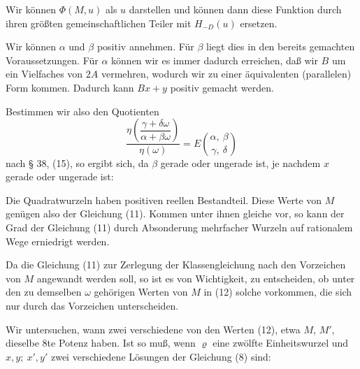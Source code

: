 
Wir können $\Phi(M,u)$ als  $u$ darstellen und können dann diese Funktion durch ihren größten gemeinschaftlichen Teiler mit $H_{-D}(u)$ ersetzen.

Wir können $\alpha$ und $\beta$ positiv annehmen. Für $\beta$ liegt dies in den bereits gemachten Voraussetzungen. Für $\alpha$ können wir es immer dadurch erreichen, daß wir $B$ um ein Vielfaches von $2A$ vermehren, wodurch wir zu einer äquivalenten (parallelen) Form kommen. Dadurch kann $Bx+y$ positiv gemacht werden.

Bestimmen wir also den Quotienten
\[
\frac{\eta\left(\dfrac{\gamma+\delta\omega}{\alpha+\beta\omega}\right)}{\eta(\omega)} = E\binom{\alpha,\ \beta}{\gamma,\ \delta}
\]
nach § 38, (15), so ergibt sich, da $\beta$ gerade oder ungerade ist, je nachdem $x$ gerade oder ungerade ist:


Die Quadratwurzeln
haben positiven reellen Bestandteil. Diese Werte von $M$ genügen also der Gleichung (11). Kommen unter ihnen gleiche vor, so kann der Grad der Gleichung (11) durch Absonderung mehrfacher Wurzeln auf rationalem Wege erniedrigt werden.

Da die Gleichung (11) zur Zerlegung der Klassengleichung nach den Vorzeichen von $M$ angewandt werden soll, so ist es von Wichtigkeit, zu entscheiden, ob unter den zu demselben $\omega$ gehörigen Werten von $M$ in (12) solche vorkommen, die sich nur durch das Vorzeichen unterscheiden.

Wir untersuchen, wann zwei verschiedene von den Werten (12), etwa $M$, $M'$, dieselbe 8te Potenz haben. Ist
so muß, wenn $\varrho$ eine zwölfte Einheitswurzel und $x,y;\ x',y'$ zwei verschiedene Lösungen der Gleichung (8) sind:
